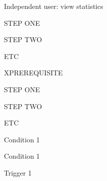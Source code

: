 

\begin{uc}{Independent user: view statistics}

    \begin{uc-mss}
    \item STEP ONE
    \item STEP TWO
    \item ETC
    \end{uc-mss}

    \begin{uc-ext}

        \begin{uc-fail}{X}{PREREQUISITE}
        \item STEP ONE
        \item STEP TWO
        \item ETC
        \end{uc-fail}

    \end{uc-ext}

    \begin{uc-pre}
    \item Condition 1
    \end{uc-pre}

    \begin{uc-post}
    \item Condition 1
    \end{uc-post}

    \begin{uc-trig}
    \item Trigger 1
    \end{uc-trig}

\end{uc}